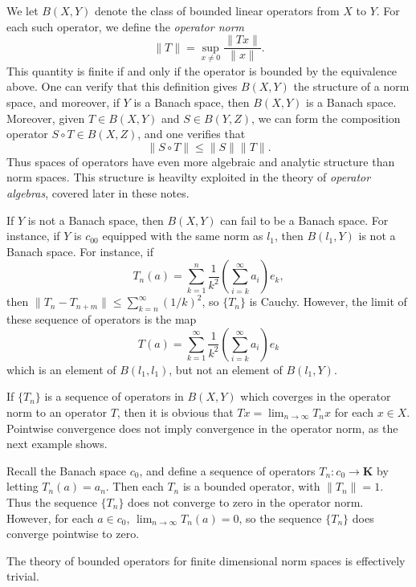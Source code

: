 We let $B(X,Y)$ denote the class of bounded linear operators from $X$ to $Y$. For each such operator, we define the {\it operator norm}
%
\[ \| T \| = \sup_{x \neq 0} \frac{\| Tx \|}{\| x \|}. \]
%
This quantity is finite if and only if the operator is bounded by the equivalence above. One can verify that this definition gives $B(X,Y)$ the structure of a norm space, and moreover, if $Y$ is a Banach space, then $B(X,Y)$ is a Banach space. Moreover, given $T \in B(X,Y)$ and $S \in B(Y,Z)$, we can form the composition operator $S \circ T \in B(X,Z)$, and one verifies that
%
\[ \| S \circ T \| \leq \| S \| \| T \|. \]
%
Thus spaces of operators have even more algebraic and analytic structure than norm spaces. This structure is heavilty exploited in the theory of {\it operator algebras}, covered later in these notes.

\begin{example}
    If $Y$ is not a Banach space, then $B(X,Y)$ can fail to be a Banach space. For instance, if $Y$ is $c_{00}$ equipped with the same norm as $l_1$, then $B(l_1,Y)$ is not a Banach space. For instance, if
    \[ T_n(a) = \sum_{k = 1}^n \frac{1}{k^2} \left( \sum_{i = k}^\infty a_i \right) e_k, \]
    then $\| T_n - T_{n + m} \| \leq \sum_{k = n}^\infty (1/k)^2$, so $\{ T_n \}$ is Cauchy. However, the limit of these sequence of operators is the map
    \[ T(a) = \sum_{k = 1}^\infty \frac{1}{k^2} \left( \sum_{i = k}^\infty a_i \right) e_k \]
    which is an element of $B(l_1,l_1)$, but not an element of $B(l_1,Y)$.
\end{example}

If $\{ T_n \}$ is a sequence of operators in $B(X,Y)$ which coverges in the operator norm to an operator $T$, then it is obvious that $Tx = \lim_{n \to \infty} T_nx$ for each $x \in X$. Pointwise convergence does not imply convergence in the operator norm, as the next example shows.

\begin{example}
    Recall the Banach space $c_0$, and define a sequence of operators $T_n: c_0 \to \mathbf{K}$ by letting $T_n(a) = a_n$. Then each $T_n$ is a bounded operator, with $\| T_n \| = 1$. Thus the sequence $\{ T_n \}$ does not converge to zero in the operator norm. However, for each $a \in c_0$, $\lim_{n \to \infty} T_n(a) = 0$, so the sequence $\{ T_n \}$ does converge pointwise to zero.
\end{example}

The theory of bounded operators for finite dimensional norm spaces is effectively trivial.

